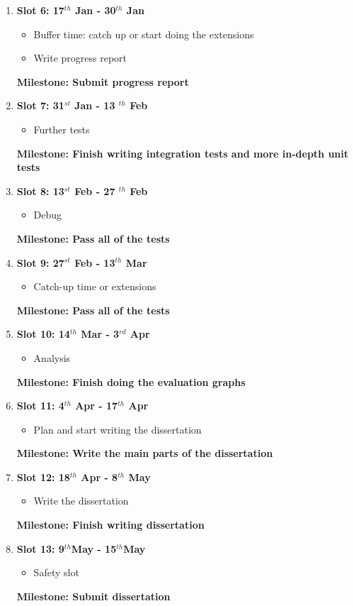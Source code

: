 \begin{enumerate}
\begin{itemize}
		\item Implement the edge-detector
	\end{itemize}
	{\bf Milestone: Finish implementation, Pass the unit tests for the edge-detection module} 
\item {\bf Slot 6: 17$^{th}$ Jan  - 30$^{th}$ Jan}
	\begin{itemize}
		\item Buffer time: catch up or start doing the extensions
		\item Write progress report
	\end{itemize}
	{\bf Milestone: Submit progress report} 
\item {\bf Slot 7: 31$^{st}$ Jan - 13 $^{th}$ Feb}
	\begin{itemize}
		\item Further tests
	\end{itemize}
	{\bf Milestone: Finish writing integration tests and more in-depth unit tests} 
\item {\bf Slot 8: 13$^{st}$ Feb - 27 $^{th}$ Feb}
	\begin{itemize}
		\item Debug
	\end{itemize}
	{\bf Milestone: Pass all of the tests}
\item {\bf Slot 9: 27$^{st}$ Feb - 13$^{th}$ Mar}
	\begin{itemize}
		\item Catch-up time or extensions
	\end{itemize}
	{\bf Milestone: Pass all of the tests} 
\item {\bf Slot 10: 14$^{th}$ Mar - 3$^{rd}$ Apr}
	\begin{itemize}
		\item Analysis
	\end{itemize}
	{\bf Milestone: Finish doing the evaluation graphs} 
\item {\bf Slot 11: 4$^{th}$ Apr - 17$^{th}$ Apr}
	\begin{itemize}
		\item Plan and start writing the dissertation
	\end{itemize}
	{\bf Milestone: Write the main parts of the dissertation}
\item {\bf Slot 12: 18$^{th}$ Apr - 8$^{th}$ May}
	\begin{itemize}
		\item Write the dissertation
	\end{itemize}
	{\bf Milestone: Finish writing dissertation}	 
\item {\bf Slot 13: 9$^{th}$May  - 15$^{th}$May}
	\begin{itemize}
		\item Safety slot
	\end{itemize}
	{\bf Milestone: Submit dissertation} 
\end{enumerate}



 

